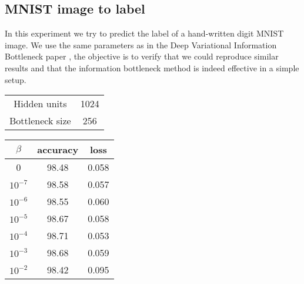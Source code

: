 \documentclass[11pt,oneside,openright]{report}
\begin{document}
\subsection{MNIST image to label}

In this experiment we try to predict the label of a hand-written digit MNIST \cite{mnist} image.  We use the same parameters as in the Deep Variational Information Bottleneck paper \cite{vib}, the objective is to verify that we could reproduce similar results and that the information bottleneck method is indeed effective in a simple setup.

\begin{minipage}{0.35\textwidth}
        \centering
\begin{tabular}{ c | c  }
 Hidden units & 1024 \\
 Bottleneck size & 256 \\
\end{tabular}
    \end{minipage}\hfill
    \begin{minipage}{0.8\textwidth}
        \centering
\begin{tabular}{ c | c c }
 $\beta$ & accuracy & loss \\
 \hline
0 & 98.48 & 0.058 \\
$10^{-7}$ & 98.58 & 0.057\\
$10^{-6}$ & 98.55 & 0.060\\
$10^{-5}$ & 98.67 & 0.058\\
$10^{-4}$ & 98.71 & 0.053 \\
$10^{-3}$ & 98.68 & 0.059 \\
$10^{-2}$ & 98.42 & 0.095 \\
\end{tabular}
    \end{minipage}

\begin{center}
\end{center}
\end{document}
